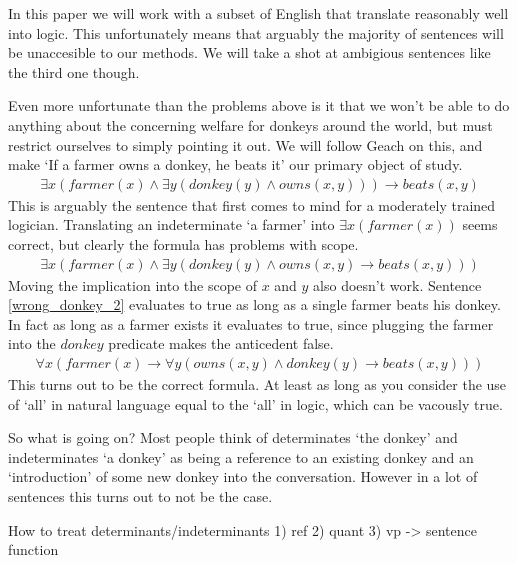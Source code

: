 \documentclass[12pt]{article}
\begin{document}
In this paper we will work with a subset of English that translate reasonably well into logic. This unfortunately means that arguably the majority of sentences will be unaccesible to our methods. We will take a shot at ambigious sentences like the third one though.

Even more unfortunate than the problems above is it that we won't be able to do anything about the concerning welfare for donkeys around the world\cite{donkey2013sanctuary}, but must restrict ourselves to simply pointing it out. We will follow Geach\cite{geach1962reference} on this, and make `If a farmer owns a donkey, he beats it' our primary object of study.
%
\begin{align}
\exists x (farmer(x) \wedge \exists y (donkey(y)\wedge owns(x,y))) \rightarrow beats(x,y)
\end{align}
%
This is arguably the sentence that first comes to mind for a moderately trained logician. Translating an indeterminate `a farmer' into $\exists x(farmer(x))$ seems correct, but clearly the formula has problems with scope.
%
\begin{align}
\exists x (farmer(x) \wedge \exists y (donkey(y)\wedge owns(x,y) \rightarrow beats(x,y))) \label{wrong_donkey_2}
\end{align}
%
Moving the implication into the scope of $x$ and $y$ also doesn't work. Sentence \eqref{wrong_donkey_2} evaluates to true as long as a single farmer beats his donkey. In fact as long as a farmer exists it evaluates to true, since plugging the farmer into the $donkey$ predicate makes the anticedent false.
%
\begin{align}
\forall x (farmer(x) \rightarrow \forall y ( owns(x,y) \wedge donkey(y) \rightarrow beats(x,y))) \label{correct_donkey}
\end{align}
%
This turns out to be the correct formula. At least as long as you consider the use of `all' in natural language equal to the `all' in logic, which can be vacously true.

So what is going on? Most people think of determinates `the donkey' and indeterminates `a donkey' as being a reference to an existing donkey and an `introduction' of some new donkey into the conversation. However in a lot of sentences this turns out to not be the case.

How to treat determinants/indeterminants
  1) ref
  2) quant
  3) vp -> sentence function
\end{document}
